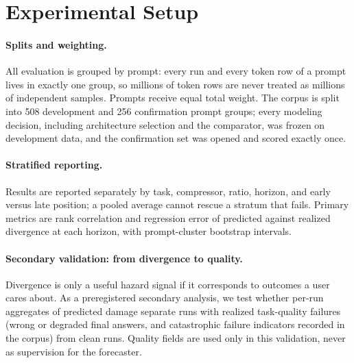 \section{Experimental Setup}

\label{sec:setup}

\paragraph{Splits and weighting.}
All evaluation is grouped by prompt: every run and every token row of a
prompt lives in exactly one group, so millions of token rows are never
treated as millions of independent samples. Prompts receive equal total
weight. The corpus is split into 508 development and 256 confirmation prompt
groups; every modeling decision, including architecture selection and the
comparator, was frozen on development data, and the confirmation set was
opened and scored exactly once. 

\paragraph{Stratified reporting.}
Results are reported separately by task, compressor, ratio, horizon, and
early versus late position; a pooled average cannot rescue a stratum that
fails. Primary metrics are rank correlation and regression error of predicted
against realized divergence at each horizon, with prompt-cluster bootstrap
intervals. 

\paragraph{Secondary validation: from divergence to quality.}
Divergence is only a useful hazard signal if it corresponds to outcomes a
user cares about. As a preregistered secondary analysis, we test whether
per-run aggregates of predicted damage separate runs with realized
task-quality failures (wrong or degraded final answers, and catastrophic
failure indicators recorded in the corpus) from clean runs. Quality fields
are used only in this validation, never as supervision for the forecaster.

